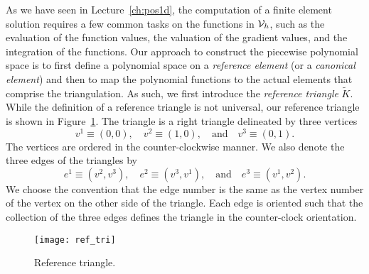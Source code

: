 As we have seen in Lecture~\ref{ch:pos1d}, the computation of a finite element solution requires a few common tasks on the functions in $\mathcal{V}_h$, such as the evaluation of the function values, the valuation of the gradient values, and the integration of the functions.  Our approach to construct the piecewise polynomial space is to first define a polynomial space on a \emph{reference element} (or a \emph{canonical element}) and then to map the polynomial functions to the actual elements that comprise the triangulation.  As such, we first introduce the \emph{reference triangle} $\tilde K$.  While the definition of a reference triangle is not universal, our reference triangle is shown in Figure~\ref{fig:fe_ref_tri}.  The triangle is a right triangle delineated by three vertices
\begin{equation*}
  v^1 \equiv (0,0), \quad v^2 \equiv (1,0), \quad \text{and} \quad v^3 \equiv (0,1).
\end{equation*}
The vertices are ordered in the counter-clockwise manner. We also denote the three edges of the triangles by
\begin{equation*}
  e^1 \equiv (v^2,v^3), \quad e^2 \equiv (v^3,v^1), \quad \text{and} \quad e^3 \equiv (v^1,v^2).
\end{equation*}
We choose the convention that the edge number is the same as the vertex number of the vertex on the other side of the triangle. Each edge is oriented such that the collection of the three edges defines the triangle in the counter-clock orientation.  

\begin{figure}
  \centering
  \texttt{[image: ref\_tri]}
  \caption{Reference triangle.}
  \label{fig:fe_ref_tri}
\end{figure}

